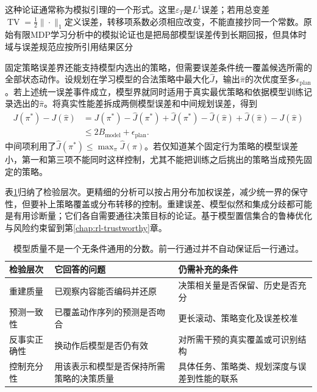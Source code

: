 这种论证通常称为模拟引理的一个形式。这里$\varepsilon_T$是$L^1$误差；若用总变差$\operatorname{TV}=\tfrac12\|\cdot\|_1$定义误差，转移项系数必须相应改变，不能直接抄同一个常数。原始有限MDP学习分析中的模拟论证也是把局部模型误差传到长期回报，但具体时域与误差规范应按所引用结果区分

固定策略误差界还能支持模型内选出的策略，但需要误差条件统一覆盖候选所需的全部状态动作。设规划在学习模型的合法策略中最大化$\widehat J$，输出$\widehat\pi$的次优度至多$\epsilon_{\mathrm{plan}}$。若上述统一误差事件成立，模型界就同时适用于真实最优策略和依据模型训练记录选出的$\widehat\pi$。将真实性能差拆成两侧模型误差和中间规划误差，得到
\begin{align*}
  J(\pi^*)-J(\widehat\pi)
   &=J(\pi^*)-\widehat J(\pi^*)
     +\widehat J(\pi^*)-\widehat J(\widehat\pi)
     +\widehat J(\widehat\pi)-J(\widehat\pi)\\
   &\leq 2B_{\mathrm{model}}+\epsilon_{\mathrm{plan}}.
\end{align*}
中间项利用了$\widehat J(\pi^*)\leq\max_\pi\widehat J(\pi)$。若仅知道某个固定行为策略的模型误差小，第一和第三项不能同时这样控制，尤其不能把训练之后挑出的策略当成预先固定的策略。

表\ref{tab:rl-learning-model-validity}归纳了检验层次。更精细的分析可以按占用分布加权误差，减少统一界的保守性，但要补上策略覆盖或分布转移的控制。重建误差、模型似然和集成分歧都可能是有用诊断量；它们各自需要通往决策目标的论证。基于模型置信集合的鲁棒优化与风险约束留到第\ref{chap:rl-trustworthy}章。

\begin{table}[t]
  \centering
  \small
  \begin{tabularx}{\linewidth}{>{\raggedright\arraybackslash}p{24mm} >{\raggedright\arraybackslash}X >{\raggedright\arraybackslash}X}
    \toprule
    检验层次 & 它回答的问题 & 仍需补充的条件 \\
    \midrule
    重建质量 & 已观察内容能否编码并还原 & 决策相关量是否保留、历史是否充分 \\
    预测一致性 & 已覆盖动作序列的预测是否吻合 & 更长滚动、策略变化及误差校准 \\
    反事实正确性 & 换动作后模型是否仍有效 & 对所需干预的真实覆盖或可识别结构 \\
    控制充分性 & 用该表示和模型是否保持所需策略的决策质量 & 具体任务、策略类、规划深度与误差到性能的联系 \\
    \bottomrule
  \end{tabularx}
  \caption{模型质量不是一个无条件通用的分数。前一行通过并不自动保证后一行通过。}
  \label{tab:rl-learning-model-validity}
\end{table}

